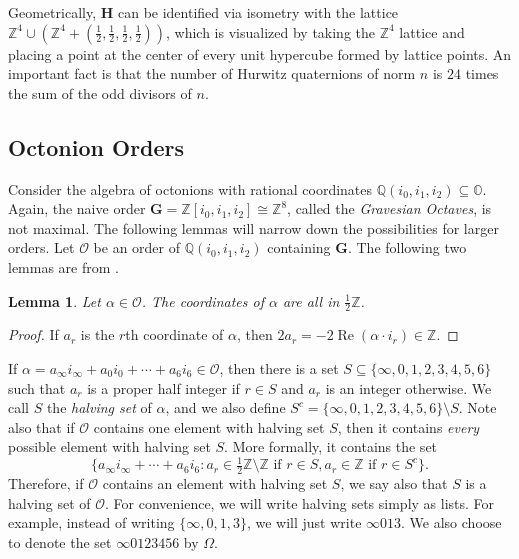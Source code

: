 \documentclass[10pt]{amsart}
\newcommand{\Q}{\mathbb{Q}}
\newcommand{\Z}{\mathbb{Z}}
\renewcommand{\O}{\mathbb{O}}
\newcommand{\HH}{\mathbf{H}}
\newcommand{\G}{\mathbf{G}}
\DeclareMathOperator*{\re}{Re}
\newcommand{\Ord}{\mathcal{O}}
\newtheorem{lem}[thm]{Lemma}
\begin{document}
Geometrically, $\HH$ can be identified via isometry with the lattice $\Z^4 \cup \left(\Z^4 + (\frac12,\frac12,\frac12,\frac12) \right)$, which is visualized by taking the $\Z^4$ lattice and placing a point at the center of every unit hypercube formed by lattice points.  An important fact is that the number of Hurwitz quaternions of norm $n$ is $24$ times the sum of the odd divisors of $n$.







\subsection*{Octonion Orders}

Consider the algebra of octonions with rational coordinates $\Q(i_0,i_1,i_2)\subseteq \O$.  Again, the naive order $\G = \Z[i_0,i_1,i_2] \cong \Z^8$, called the \emph{Gravesian Octaves}, is not maximal.  The following lemmas will narrow down the possibilities for larger orders.  Let $\Ord$ be an order of $\Q(i_0,i_1,i_2)$ containing $\G$.  The following two lemmas are from \cite{Co03}.

\begin{lem} \label{lem:half}
\normalfont
Let $\alpha \in \Ord$.  The coordinates of $\alpha$ are all in $\frac12 \Z$.
\end{lem}
\begin{proof}
If $a_r$ is the $r$th coordinate of $\alpha$, then $2a_r = -2\re(\alpha \cdot i_r) \in \Z.$
\end{proof}

If $\alpha = a_\infty i_\infty + a_0 i_0 + \cdots + a_6i_6 \in \Ord$, then there is a set $S \subseteq \{\infty, 0, 1,2,3,4,5 , 6\}$ such that $a_r$ is a proper half integer if $r \in S$ and $a_r$ is an integer otherwise.  We call $S$ the \emph{halving set} of $\alpha$, and we also define $S^c = \{\infty, 0, 1 ,2,3,4,5 , 6\} \setminus S$.  Note also that if $\Ord$ contains one element with halving set $S$, then it contains \emph{every} possible element with halving set $S$.  More formally, it contains the set
$$
\{a_\infty i_\infty + \cdots + a_6i_6: a_r \in \tfrac{1}{2} \Z \setminus \Z \text{ if } r \in S, a_r \in \Z \text{ if } r \in S^c\}.
$$
Therefore, if $\Ord$ contains an element with halving set $S$, we say also that $S$ is a halving set of $\Ord$.  For convenience, we will write halving sets simply as lists.  For example, instead of writing $\{\infty, 0 , 1 , 3\}$, we will just write $\infty 013$.  We also choose to denote the set $\infty 0123456$ by $\Omega$.
\end{document}
